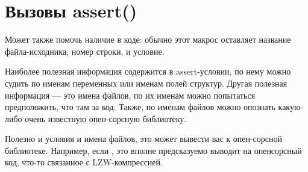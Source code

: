 \section{Вызовы assert()}
Может также помочь наличие  в коде: обычно этот макрос оставляет название файла-исходника, 
номер строки, и условие.

Наиболее полезная информация содержится в assert-условии, по нему можно судить по именам переменных
или именам полей структур. Другая полезная информация --- это имена файлов, по их именам можно попытаться
предположить, что там за код. Также, по именам файлов можно опознать какую-либо очень известную опен-сорсную
библиотеку.



Полезно  и условия и имена файлов, это может вывести вас к опен-сорсной библиотеке.
Например, если  , 
это вполне предсказуемо выводит на опенсорсный код, что-то связанное с LZW-компрессией.

